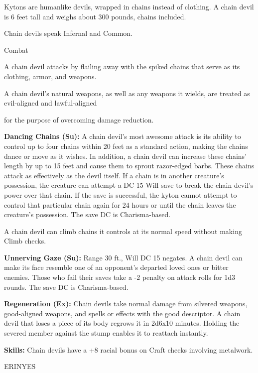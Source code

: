 \documentclass{article}
\begin{document}
Kytons are humanlike devils, wrapped in chains instead of clothing. A chain devil 
is 6 feet tall and weighs about 300 pounds, chains included.

Chain devils speak Infernal and Common.

Combat

A chain devil attacks by flailing away with the spiked chains that serve as its 
clothing, armor, and weapons. 

A chain devil's natural weapons, as well as any weapons it wields, are treated 
as evil-aligned and lawful-aligned

for the purpose of overcoming damage reduction.

\textbf{Dancing Chains (Su): }A chain devil's most awesome attack is its ability 
to control up to four chains within 20 feet as a standard action, making the chains 
dance or move as it wishes. In addition, a chain devil can increase these chains' 
length by up to 15 feet and cause them to sprout razor-edged barbs. These chains 
attack as effectively as the devil itself. If a chain is in another creature's 
possession, the creature can attempt a DC 15 Will save to break the chain devil's 
power over that chain. If the save is successful, the kyton cannot attempt to control 
that particular chain again for 24 hours or until the chain leaves the creature's 
possession. The save DC is Charisma-based.

A chain devil can climb chains it controls at its normal speed without making Climb 
checks.

\textbf{Unnerving Gaze (Su):} Range 30 ft., Will DC 15 negates. A chain devil can 
make its face resemble one of an opponent's departed loved ones or bitter enemies. 
Those who fail their saves take a -2 penalty on attack rolls for 1d3 rounds. The 
save DC is Charisma-based.

\textbf{Regeneration (Ex): }Chain devils take normal damage from silvered weapons, 
good-aligned weapons, and spells or effects with the good descriptor. A chain devil 
that loses a piece of its body regrows it in 2d6x10 minutes. Holding the severed 
member against the stump enables it to reattach instantly.

\textbf{Skills:} Chain devils have a +8 racial bonus on Craft checks involving 
metalwork.

\vspace{12pt}
ERINYES
\end{document}
